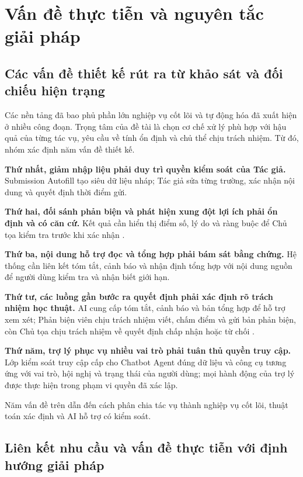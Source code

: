 \section{Vấn đề thực tiễn và nguyên tắc giải pháp}

\subsection{Các vấn đề thiết kế rút ra từ khảo sát và đối chiếu hiện trạng}

Các nền tảng đã bao phủ phần lớn nghiệp vụ cốt lõi và tự động hóa đã xuất hiện ở nhiều công đoạn. Trọng tâm của đề tài là chọn cơ chế xử lý phù hợp với hậu quả của từng tác vụ, yêu cầu về tính ổn định và chủ thể chịu trách nhiệm. Từ đó, nhóm xác định năm vấn đề thiết kế.

\textbf{Thứ nhất, giảm nhập liệu phải duy trì quyền kiểm soát của Tác giả.} Submission Autofill tạo siêu dữ liệu nháp; Tác giả sửa từng trường, xác nhận nội dung và quyết định thời điểm gửi.

\textbf{Thứ hai, đối sánh phản biện và phát hiện xung đột lợi ích phải ổn định và có căn cứ.} Kết quả cần hiển thị điểm số, lý do và ràng buộc để Chủ tọa kiểm tra trước khi xác nhận \cite{ch2ref8,ch2ref53,ch2ref55}.

\textbf{Thứ ba, nội dung hỗ trợ đọc và tổng hợp phải bám sát bằng chứng.} Hệ thống cần liên kết tóm tắt, cảnh báo và nhận định tổng hợp với nội dung nguồn để người dùng kiểm tra và nhận biết giới hạn.

\textbf{Thứ tư, các luồng gần bước ra quyết định phải xác định rõ trách nhiệm học thuật.} AI cung cấp tóm tắt, cảnh báo và bản tổng hợp để hỗ trợ xem xét; Phản biện viên chịu trách nhiệm viết, chấm điểm và gửi bản phản biện, còn Chủ tọa chịu trách nhiệm về quyết định chấp nhận hoặc từ chối \cite{ch2ref15,ch2ref16,ch2ref17,ch2ref18}.

\textbf{Thứ năm, trợ lý phục vụ nhiều vai trò phải tuân thủ quyền truy cập.} Lớp kiểm soát truy cập cấp cho Chatbot Agent đúng dữ liệu và công cụ tương ứng với vai trò, hội nghị và trạng thái của người dùng; mọi hành động của trợ lý được thực hiện trong phạm vi quyền đã xác lập.

Năm vấn đề trên dẫn đến cách phân chia tác vụ thành nghiệp vụ cốt lõi, thuật toán xác định và AI hỗ trợ có kiểm soát.

\subsection{Liên kết nhu cầu và vấn đề thực tiễn với định hướng giải pháp}

